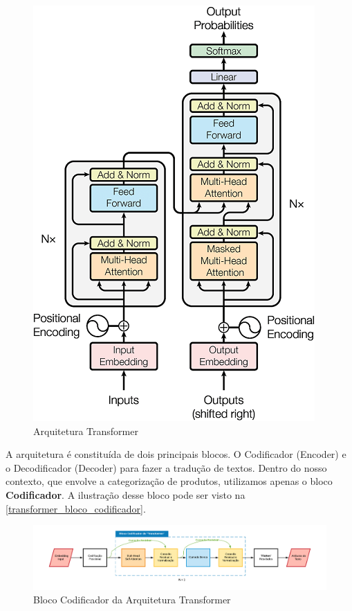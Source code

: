 \begin{figure}[]
	\caption{\label{transformer_architecture} Arquitetura Transformer}
	\begin{center}
	    \includegraphics[scale=0.5]{artigo/recursos/imagens/transformer_architecture.png}
	\end{center}
\end{figure}

A arquitetura é constituída de dois principais blocos. O Codificador (Encoder) e o Decodificador (Decoder) para fazer a tradução de textos. Dentro do nosso contexto, que envolve a categorização de produtos, utilizamos apenas o bloco \textbf{Codificador}. A ilustração desse bloco pode ser visto na \autoref{transformer_bloco_codificador}.

\begin{figure}[]
	\caption{\label{transformer_bloco_codificador} Bloco Codificador da Arquitetura Transformer}
	\begin{center}
	    \includegraphics[scale=0.5]{artigo/recursos/imagens/transformer_bloco_codificador.png}
	\end{center}
\end{figure}

